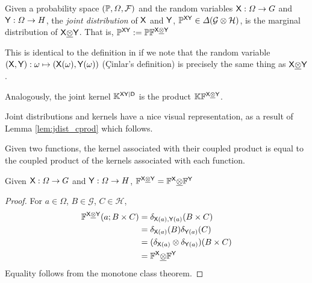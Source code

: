 \begin{definition}\label{def:joint_distribution}
Given a probability space $(\mathbb{P},\Omega,\mathcal{F})$ and the random variables $\mathsf{X}:\Omega\to G$ and $\mathsf{Y}:\Omega\to H$, the \emph{joint distribution} of $\mathsf{X}$ and $\mathsf{Y}$, $\mathbb{P}^{\mathsf{X}\mathsf{Y}}\in \Delta(\mathcal{G}\otimes\mathcal{H})$, is the marginal distribution of $\mathsf{X}\underline{\otimes}\mathsf{Y}$. That is, $\mathbb{P}^{\mathsf{X}\mathsf{Y}}:=\mathbb{P} \mathbb{F}^{\mathsf{X}\underline{\otimes}\mathsf{Y}}$

This is identical to the definition in \citet{cinlar_probability_2011} if we note that the random variable $(\mathsf{X},\mathsf{Y}):\omega\mapsto (\mathsf{X}(\omega),\mathsf{Y}(\omega))$ (\c{C}inlar's definition) is precisely the same thing as $\mathsf{X}\underline{\otimes}\mathsf{Y}$.

Analogously, the joint kernel $\mathbb{K}^{\mathsf{X}\mathsf{Y}|\mathsf{D}}$ is the product $\mathbb{K}\mathbb{F}^{\mathsf{X}\underline{\otimes}\mathsf{Y}}$.
\end{definition}

Joint distributions and kernels have a nice visual representation, as a result of Lemma \ref{lem:jdist_cprod} which follows.

\begin{lemma}\label{lem:jdist_cprod}
Given two functions, the kernel associated with their coupled product is equal to the coupled product of the kernels associated with each function.

Given $\mathsf{X}:\Omega\to G$ and $\mathsf{Y}:\Omega\to H$, $\mathbb{F}^{\mathsf{X}\underline{\otimes}\mathsf{Y}}=\mathbb{F}^{\mathsf{X}}\underline{\otimes}\mathbb{F}^{\mathsf{Y}}$
\end{lemma}

\begin{proof}
For $a\in \Omega$, $B\in \mathcal{G}$, $C\in \mathcal{H}$,
\begin{align}
\mathbb{F}^{\mathsf{X}\underline{\otimes}\mathsf{Y}} (a;B\times C) &= \delta_{\mathsf{X}(a),\mathsf{Y}(a)}(B\times C)\\
									   &= \delta_{\mathsf{X}(a)}(B)\delta_{\mathsf{Y}(a)}(C)\\
									   &= (\delta_{\mathsf{X}(a)}\otimes\delta_{\mathsf{Y}(a)})(B\times C)\\
									   &= \mathbb{F}^{\mathsf{X}}\underline{\otimes}\mathbb{F}^{\mathsf{Y}}
\end{align}
Equality follows from the monotone class theorem.
\end{proof}

